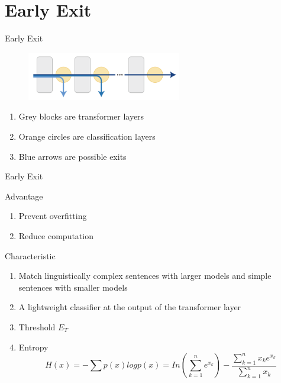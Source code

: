 \documentclass[12pt]{beamer}
\begin{document}
\section{Early Exit}
\begin{frame}{Early Exit}
    \begin{figure}[H]
    \centering
    \includegraphics[width=0.6\textwidth]{early_exit.PNG}
    \end{figure}
    
    \begin{block}{}
    \begin{enumerate}[*]
        \item Grey blocks are transformer layers
        \item Orange circles are classification layers
        \item Blue arrows are possible exits
    \end{enumerate}
    \end{block}
\end{frame}

\begin{frame}{Early Exit}
    \begin{block}{Advantage}
    \begin{enumerate}[*]
        \item Prevent overfitting
        \item Reduce computation
    \end{enumerate}
    \end{block}
    
    \begin{block}{Characteristic}
    \begin{enumerate}[*]
        \item Match linguistically complex sentences with larger models and simple sentences with smaller models
        \item A lightweight classifier at the output of the transformer layer
        \item Threshold $E_T$
        \item Entropy
        \[H(x)=-\sum p(x)logp(x) = In(\sum^n_{k=1}e^{x_k})-\frac{\sum^n_{k=1}x_ke^{x_k}}{\sum^n_{k=1}x_k}\]
    \end{enumerate}
    \end{block}
\end{frame}
\end{document}
